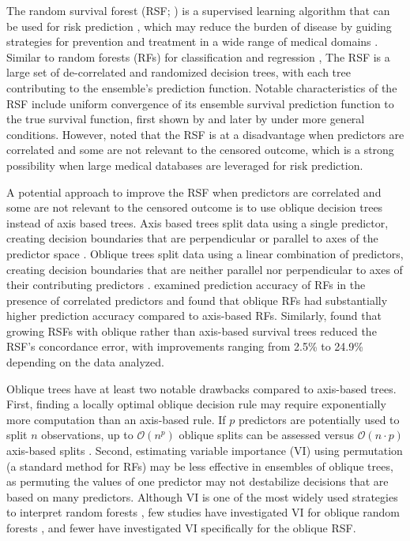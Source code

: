 \documentclass[twoside,11pt]{article}\usepackage[]{graphicx}\usepackage[]{xcolor}
\begin{document}
The random survival forest (RSF; \citet{ishwaran2008random, hothorn2006unbiased}) is a supervised learning algorithm that can be used for risk prediction \citep{wang2017selective}, which may reduce the burden of disease by guiding strategies for prevention and treatment in a wide range of medical domains \citep{moons2012riskII, moons2012riskI}. Similar to random forests (RFs) for classification and regression \citep{breiman2001random}, The RSF is a large set of de-correlated and randomized decision trees, with each tree contributing to the ensemble's prediction function. Notable characteristics of the RSF include uniform convergence of its ensemble survival prediction function to the true survival function, first shown by \citet{ishwaran2010consistency} and later by \citet{cui2017consistency} under more general conditions. However, \citet{cui2017consistency} noted that the RSF is at a disadvantage when predictors are correlated and some are not relevant to the censored outcome, which is a strong possibility when large medical databases are leveraged for risk prediction.

A potential approach to improve the RSF when predictors are correlated and some are not relevant to the censored outcome is to use oblique decision trees instead of axis based trees. Axis based trees split data using a single predictor, creating decision boundaries that are perpendicular or parallel to axes of the predictor space \citep[see][Chapter~2]{breiman2017classification}. Oblique trees split data using a linear combination of predictors, creating decision boundaries that are neither parallel nor perpendicular to axes of their contributing predictors \citep[see][Chapter~5]{breiman2017classification}. \citet{menze2011oblique} examined prediction accuracy of RFs in the presence of correlated predictors and found that oblique RFs had substantially higher prediction accuracy compared to axis-based RFs. Similarly, \citet{jaeger2019oblique} found that growing RSFs with oblique rather than axis-based survival trees reduced the RSF's concordance error, with improvements ranging from 2.5\% to 24.9\% depending on the data analyzed.

Oblique trees have at least two notable drawbacks compared to axis-based trees. First, finding a locally optimal oblique decision rule may require exponentially more computation than an axis-based rule. If $p$ predictors are potentially used to split $n$ observations, up to $\mathcal{O}(n^p)$ oblique splits can be assessed versus $\mathcal{O}(n \cdot p)$ axis-based splits \citep{heath1993induction, murthy1994system}. Second, estimating variable importance (VI) using permutation (a standard method for RFs) may be less effective in ensembles of oblique trees, as permuting the values of one predictor may not destabilize decisions that are based on many predictors. Although VI is one of the most widely used strategies to interpret random forests \citep{ishwaran2019standard}, few studies have investigated VI for oblique random forests \citep[see][Section~5]{menze2011oblique}, and fewer have investigated VI specifically for the oblique RSF.
\end{document}
